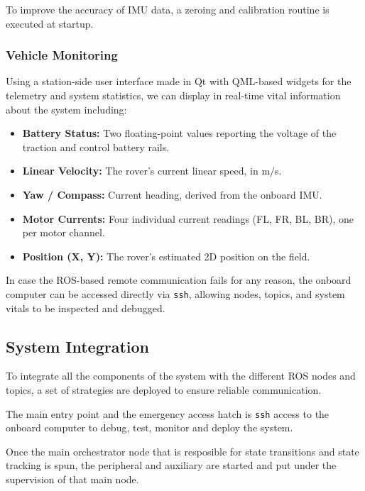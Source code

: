 \documentclass[12pt,a4paper,twocolumn]{article}
\begin{document}
To improve the accuracy of IMU data, a zeroing and calibration routine is executed at startup.


\subsubsection{Vehicle Monitoring}

Using a station-side user interface made in Qt with QML-based widgets for the telemetry and system statistics, we can display in real-time vital information about the system including:

\begin{itemize}
    \item \textbf{Battery Status:} Two floating-point values reporting the voltage of the traction and control battery rails.
    \item \textbf{Linear Velocity:} The rover's current linear speed, in m/s.
    \item \textbf{Yaw / Compass:} Current heading, derived from the onboard IMU.
    \item \textbf{Motor Currents:} Four individual current readings (FL, FR, BL, BR), one per motor channel.
    \item \textbf{Position (X, Y):} The rover's estimated 2D position on the field.
\end{itemize}

In case the ROS-based remote communication fails for any reason, the onboard computer can be accessed directly via \texttt{ssh}, allowing nodes, topics, and system vitals to be inspected and debugged.

\subsection{System Integration}

To integrate all the components of the system with the different ROS nodes and topics, a set of strategies are deployed to ensure reliable communication.

The main entry point and the emergency access hatch is \texttt{ssh} access to the onboard computer to debug, test, monitor and deploy the system.

Once the main orchestrator node that is resposible for state transitions and state tracking is spun, the peripheral and auxiliary are started and put under the supervision of that main node.
\end{document}
